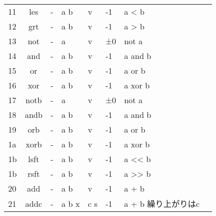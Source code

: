 \begin{table}[h]
\begin{tabular}{lcllllll}
        11 & les & - & a b & v & -1 & a < b \\
        12 & grt & - & a b & v & -1 & a > b \\
        \hline
        13 & not & - & a & v & ±0 & not a \\
        14 & and & - & a b & v & -1 & a and b \\
        15 & or & - & a b & v & -1 & a or b \\
        16 & xor & - & a b & v & -1 & a xor b \\
        \hline
        17 & notb & - & a & v & ±0 & not a \\
        18 & andb & - & a b & v & -1 & a and b \\
        19 & orb & - & a b & v & -1 & a or b \\
        1a & xorb & - & a b & v & -1 & a xor b \\
        1b & lsft & - & a b & v & -1 & a << b \\
        1b & rsft & - & a b & v & -1 & a >> b \\
        \hline
        20 & add & - & a b & v & -1 & a + b \\
        21 & addc & - & a b x & c s & -1 & a + b 繰り上がりはc \\
        \hline
    \end{tabular}
\end{table}